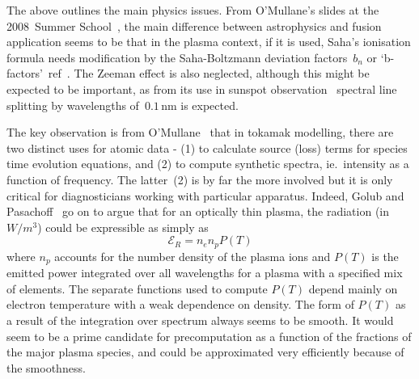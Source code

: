 The above outlines the main physics issues. From O'Mullane's slides at the 2008~Summer School~\cite{omullane},
the main difference between astrophysics and fusion
application seems to be that in the plasma context, if it is used, Saha's ionisation
formula needs modification by the Saha-Boltzmann
deviation factors~$b_n$ or `b-factors'~ref~\cite[slide 21]{omullane}.  The Zeeman effect is also neglected,
although this  might be expected to be important,
as from its use in sunspot observation~\cite[\S\,5.2]{brayloughhead} spectral line splitting
by wavelengths of~$0.1$\,nm is expected.

The key observation is from O'Mullane~\cite{omullane}
that in tokamak modelling, there are two distinct
uses for atomic data - (1) to calculate source (loss) terms for species
time evolution equations, and (2) to compute synthetic spectra, ie.\ intensity as a function
of frequency. The latter~(2) is by far the more involved but it is only critical for diagnosticians
working with particular apparatus.
Indeed, Golub and Pasachoff~\cite[\S\,3.3.2]{golubpasachoff} go on to 
argue that for an optically thin plasma, the radiation (in $W/m^3$)  could be 
expressible as simply as
\begin{equation} \label{eq:erad}
\mathcal{E}_R = n_e  n_p  P(T)
\end{equation}
where $n_p$ accounts for the number density of the plasma
ions and $P(T)$ is the emitted power integrated over all wavelengths for a plasma
with a specified mix of elements. 
The separate functions used to compute $P(T)$ depend mainly on electron temperature
with a weak dependence on density. The form of $P(T)$ as a result of the 
integration over spectrum always seems to be smooth. It would seem to
be a prime candidate for precomputation as a function of the fractions of
the major plasma species, and could be approximated very efficiently because
of the smoothness.

